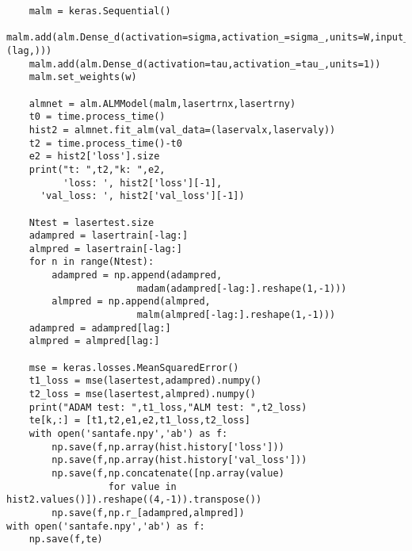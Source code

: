 \begin{verbatim}
    malm = keras.Sequential()
    malm.add(alm.Dense_d(activation=sigma,activation_=sigma_,units=W,input_shape=(lag,)))
    malm.add(alm.Dense_d(activation=tau,activation_=tau_,units=1))
    malm.set_weights(w)
    
    almnet = alm.ALMModel(malm,lasertrnx,lasertrny)
    t0 = time.process_time()
    hist2 = almnet.fit_alm(val_data=(laservalx,laservaly))
    t2 = time.process_time()-t0
    e2 = hist2['loss'].size
    print("t: ",t2,"k: ",e2, 
          'loss: ', hist2['loss'][-1],
      'val_loss: ', hist2['val_loss'][-1])
    
    Ntest = lasertest.size
    adampred = lasertrain[-lag:]
    almpred = lasertrain[-lag:]
    for n in range(Ntest):
        adampred = np.append(adampred,
                       madam(adampred[-lag:].reshape(1,-1)))
        almpred = np.append(almpred,
                       malm(almpred[-lag:].reshape(1,-1)))
    adampred = adampred[lag:]
    almpred = almpred[lag:]

    mse = keras.losses.MeanSquaredError()
    t1_loss = mse(lasertest,adampred).numpy()
    t2_loss = mse(lasertest,almpred).numpy()
    print("ADAM test: ",t1_loss,"ALM test: ",t2_loss)
    te[k,:] = [t1,t2,e1,e2,t1_loss,t2_loss]
    with open('santafe.npy','ab') as f:
        np.save(f,np.array(hist.history['loss']))
        np.save(f,np.array(hist.history['val_loss']))
        np.save(f,np.concatenate([np.array(value) 
                  for value in hist2.values()]).reshape((4,-1)).transpose())
        np.save(f,np.r_[adampred,almpred])
with open('santafe.npy','ab') as f:
    np.save(f,te)


\end{verbatim}

